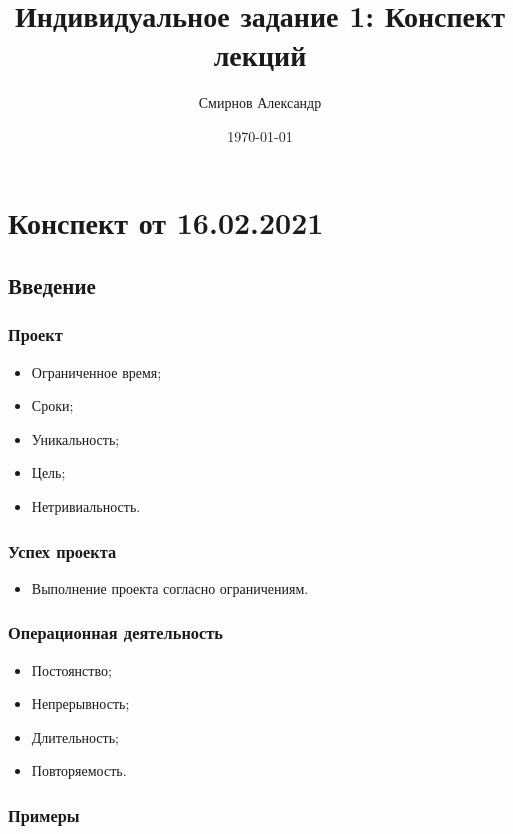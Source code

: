 \documentclass[a4paper,8pt]{article}
\title{Индивидуальное задание 1: Конспект лекций}
\author{ Смирнов Александр }
\date{\today}
\begin{document}
\maketitle
\tableofcontents
\newpage


\section{Конспект от 16.02.2021}

\subsection{Введение}

\subsubsection{Проект}


    \begin{itemize}
        \item Ограниченное время;
        \item Сроки;
        \item Уникальность;
        \item Цель;
        \item Нетривиальность.
    \end{itemize}


\subsubsection{Успех проекта}

    \begin{itemize}
        \item Выполнение проекта согласно ограничениям.
    \end{itemize}

\subsubsection{Операционная деятельность }

    \begin{itemize}
        \item Постоянство;
        \item Непрерывность;
        \item Длительность;
        \item Повторяемость.
    \end{itemize}

\subsubsection{Примеры}
\end{document}
